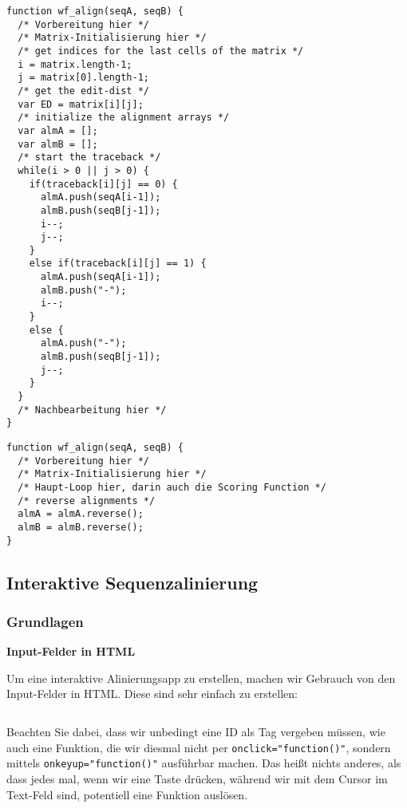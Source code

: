 \begin{verbatim}
function wf_align(seqA, seqB) {
  /* Vorbereitung hier */
  /* Matrix-Initialisierung hier */
  /* get indices for the last cells of the matrix */
  i = matrix.length-1;
  j = matrix[0].length-1;
  /* get the edit-dist */
  var ED = matrix[i][j];
  /* initialize the alignment arrays */
  var almA = [];
  var almB = [];
  /* start the traceback */
  while(i > 0 || j > 0) {
    if(traceback[i][j] == 0) {
      almA.push(seqA[i-1]);
      almB.push(seqB[j-1]);
      i--;
      j--;
    }
    else if(traceback[i][j] == 1) {
      almA.push(seqA[i-1]);
      almB.push("-");
      i--;
    }
    else {
      almA.push("-");
      almB.push(seqB[j-1]);
      j--;
    }   
  }
  /* Nachbearbeitung hier */
}
\end{verbatim}



\begin{verbatim}
function wf_align(seqA, seqB) {
  /* Vorbereitung hier */
  /* Matrix-Initialisierung hier */
  /* Haupt-Loop hier, darin auch die Scoring Function */
  /* reverse alignments */
  almA = almA.reverse();
  almB = almB.reverse();
}
\end{verbatim}

\subsection{\texorpdfstring{{Interaktive
Sequenzalinierung}}{Interaktive Sequenzalinierung}}

\subsubsection{\texorpdfstring{{Grundlagen}}{Grundlagen}}

\par\noindent\textbf{Input-Felder in HTML}

Um eine interaktive Alinierungsapp zu erstellen, machen wir Gebrauch von
den Input-Felder in HTML. Diese sind sehr einfach zu erstellen:

\begin{verbatim}
\end{verbatim}

Beachten Sie dabei, dass wir unbedingt eine ID als Tag vergeben müssen,
wie auch eine Funktion, die wir diesmal nicht per
\texttt{onclick="function()"}, sondern mittels
\texttt{onkeyup="function()"} ausführbar machen. Das heißt nichts
anderes, als dass jedes mal, wenn wir eine Taste drücken, während wir
mit dem Cursor im Text-Feld sind, potentiell eine Funktion auslösen.



